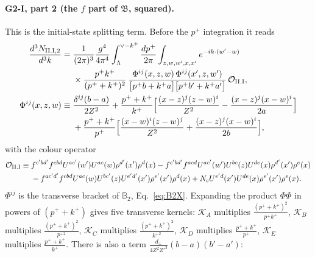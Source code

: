 \documentclass[aps,prd,onecolumn,superscriptaddress,nofootinbib,floatfix,longbibliography,11pt]{revtex4-2}
\numberwithin{equation}{section}
\newcommand{\KK}{\mathcal{K}}
\def\mf#1{\mathbb{#1}}
\newcommand{\Ord}{\mathcal{O}}
\begin{document}
\paragraph*{G2-I, part 2 (the $f$ part of $\mathfrak B$, squared).} This is the initial-state splitting term. Before the $p^+$ integration it reads
\begin{align}
\frac{d^3N_{\rm II.I,2}}{d^3k}={}&\frac{1}{(2\pi)^3}\frac{g^4}{4\pi^4}\int_{\Lambda}^{\vee-k^+}\frac{dp^+}{2\pi}\int_{z,w,w',x,x'}e^{-ik\cdot(w'-w)}\notag\\
&\times\frac{p^+k^+}{(p^++k^+)^2}\,\frac{\Phi^{ij}(x,z,w)\,\Phi^{ij}(x',z,w')}{\big[p^+b+k^+a\big]\big[p^+b'+k^+a'\big]}\,\Ord_{\rm II.I},
\label{eq:GIIIpart2}\\
\Phi^{ij}(x,z,w)\equiv{}&\frac{\delta^{ij}(b-a)}{2Z^2}+\frac{p^++k^+}{k^+}\Big[\frac{(x-z)^j(z-w)^i}{Z^2}-\frac{(x-z)^j(x-w)^i}{2a}\Big]\notag\\
&+\frac{p^++k^+}{p^+}\Big[\frac{(x-w)^i(z-w)^j}{Z^2}+\frac{(x-z)^j(x-w)^i}{2b}\Big],\notag
\end{align}
with the colour operator
\begin{align}
\Ord_{\rm II.I}\equiv{}&f^{c'bd'}f^{cbd}U^{ac'}(w')U^{ac}(w)\rho^{d'}(x')\rho^d(x)-f^{c'bd'}f^{acd}U^{ac'}(w')U^{bc}(z)U^{de}(x)\rho^{d'}(x')\rho^e(x)\notag\\
&-f^{ac'd'}f^{cbd}U^{ac}(w)U^{bc'}(z)U^{e'd'}(x')\rho^{e'}(x')\rho^d(x)+N_cU^{e'd}(x')U^{de}(x)\rho^{e'}(x')\rho^e(x).
\end{align}
$\Phi^{ij}$ is the transverse bracket of $\mf B_2$, Eq.~\eqref{eq:B2X}. Expanding the product $\Phi\Phi$ in powers of $(p^++k^+)$ gives five transverse kernels: $\KK_A$ multiplies $\frac{(p^++k^+)^2}{p^+k^+}$, $\KK_B$ multiplies $\frac{(p^++k^+)^2}{p^{+2}}$, $\KK_C$ multiplies $\frac{(p^++k^+)^2}{k^{+2}}$, $\KK_D$ multiplies $\frac{p^++k^+}{p^+}$, $\KK_E$ multiplies $\frac{p^++k^+}{k^+}$. There is also a term $\frac{d_\perp}{4Z^2Z'^2}(b-a)(b'-a')$:
\end{document}
